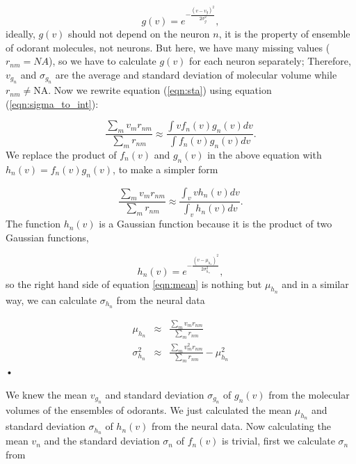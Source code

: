 \documentclass[11pt]{article} %
\begin{document}
\begin{equation}
	g(v) = e^{-\frac{(v- v_{g})^2}{2 \sigma_{g}^2}},
	\label{eqn:hist-volumes}
\end{equation}
ideally, $g(v)$ should not depend on the neuron $n$, 
it is the property of ensemble of odorant molecules, not neurons. 
But here, we have many missing values ($r_{nm} = NA$), 
so we have to calculate $g(v)$ for each neuron separately; 
Therefore, $v_{g_n}$ and $\sigma_{g_n}$ are the average and standard deviation of molecular volume while $r_{nm} \neq \text{NA}$.
Now we rewrite equation (\ref{eqn:sta}) using equation (\ref{eqn:sigma_to_int}):

\begin{equation}
	\frac{\displaystyle \sum_{m} v_m r_{nm}}{\displaystyle \sum_{m} r_{nm}} \approx \frac{\displaystyle \int v f_n(v) g_n(v) dv}{\displaystyle \int f_n(v) g_n(v) dv}.
	\label{eqn:sta_int}
\end{equation}
We replace the product of $f_n(v)$ and $g_n(v)$ in the above equation with $h_n(v) = f_n(v) g_n(v)$, to make a simpler form

\begin{equation}
	\frac{\displaystyle \sum_{m} v_m r_{nm}}{\displaystyle \sum_{m} r_{nm}} \approx \frac{\displaystyle \int_v v h_n(v) dv}{ \displaystyle \int_v  h_n(v) dv }.
	\label{eqn:mean}
\end{equation}
The function $h_n(v)$ is a Gaussian function because it is the product of two Gaussian functions, 

\begin{equation}
h_n(v) = e^{-\frac{(v-\mu_{h_n})^2}{2\sigma_{h_n}^2}}, 
\end{equation}
so the right hand side of equation \ref{eqn:mean} is nothing but $\mu_{h_n}$ and 
in a similar way, we can calculate $\sigma_{h_n}$ from the neural data

\begin{eqnarray}
	\mu_{h_n} &\approx& \frac{\displaystyle \sum_{m} v_m r_{nm}}{\displaystyle \sum_{m} r_{nm}} \\
	\sigma_{h_n}^2 &\approx& \frac{\displaystyle \sum_{m} v_m^2 r_{nm}}{\displaystyle \sum_{m} r_{nm}} - \mu_{h_n}^2
	\label{eqn:final_h}
\end{eqnarray}•


We knew the mean $v_{g_n}$ and standard deviation $\sigma_{g_n}$ of $g_n(v)$ from the molecular volumes of the ensembles of odorants. 
We just calculated the mean $\mu_{h_n}$ and standard deviation $\sigma_{h_n}$ of $h_n(v)$ from the neural data.
Now calculating the mean $v_n$ and the standard deviation $\sigma_n$ of $f_n(v)$ is trivial,
first we calculate $\sigma_n$ from 
\end{document}
